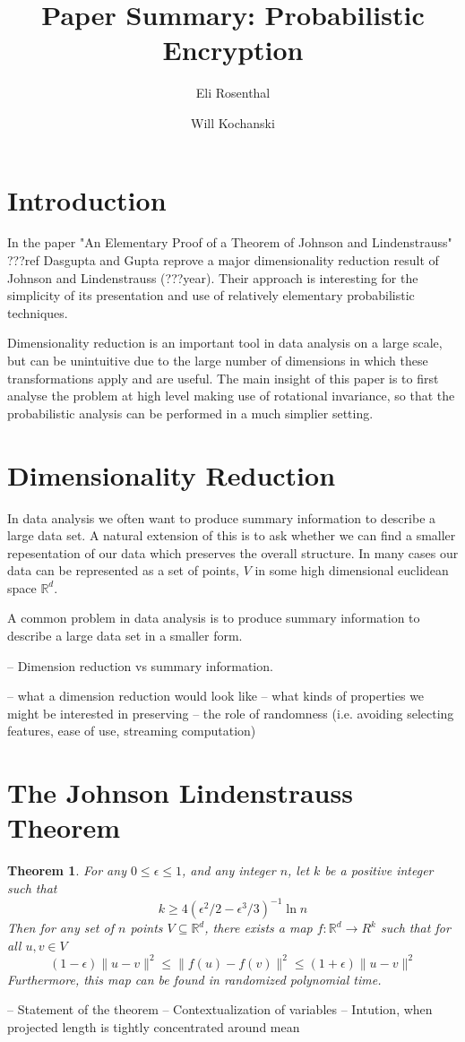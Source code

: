 \documentclass[11pt]{article}
\author{Eli Rosenthal \and Will Kochanski}
\date{}
\title{Paper Summary: Probabilistic Encryption}
\newcommand{\arr}{\rightarrow}
\newcommand{\R}{\mathbb{R}}
\newtheorem{Thm}{Theorem}
\begin{document}
\maketitle
\section{Introduction}
In the paper "An Elementary Proof of a Theorem of Johnson and Lindenstrauss" ???ref Dasgupta and Gupta reprove a major dimensionality reduction result of Johnson and Lindenstrauss (???year). Their approach is interesting for the simplicity of its presentation and use of relatively elementary probabilistic techniques.

Dimensionality reduction is an important tool in data analysis on a large scale, but can be unintuitive due to the large number of dimensions in which these transformations apply and are useful. The main insight of this paper is to first analyse the problem at high level making use of rotational invariance, so that the probabilistic analysis can be performed in a much simplier setting.

\section{Dimensionality Reduction}
In data analysis we often want to produce summary information to describe a large data set. A natural extension of this is to ask whether we can find a smaller repesentation of our data which preserves the overall structure. In many cases our data can be represented as a set of points, $V$ in some high dimensional euclidean space $\R^d$.


A common problem in data analysis is to produce summary information to describe a large data set in a smaller form.

-- Dimension reduction vs summary information.

-- what a dimension reduction would look like
-- what kinds of properties we might be interested in preserving
-- the role of randomness (i.e. avoiding selecting features, ease of use, streaming computation)

\section{The Johnson Lindenstrauss Theorem}
\begin{Thm}
    For any $0 \leq \epsilon \leq 1$, and any integer $n$, let $k$ be a positive integer such that
    \[ k \geq 4(\epsilon^2/2 - \epsilon^3/3)^{-1} \ln n \]
    Then for any set of $n$ points $V \subseteq \R^d$, there exists a map $f:\R^d \arr R^k$ such that for all $u, v \in V$
    \[(1-\epsilon)\|u - v\|^2 \leq \| f(u) - f(v) \|^2 \leq (1+\epsilon) \| u - v \|^2 \]
    Furthermore, this map can be found in randomized polynomial time.
\end{Thm}
-- Statement of the theorem
-- Contextualization of variables
-- Intution, when projected length is tightly concentrated around mean
\end{document}
